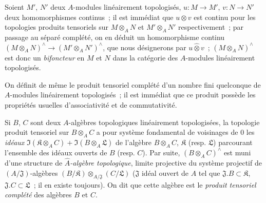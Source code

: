 \begin{env}[7.7.3]
\label{0.7.7.3-fr}
Soient $M'$, $N'$ deux $A$-modules linéairement topologisés,
$u:M\to M'$, $v:N\to N'$ deux homomorphismes continus~; il est immédiat
que $u\otimes v$ est continu pour les topologies produits tensoriels sur
$M\otimes_A N$ et $M'\otimes_A N'$ respectivement~; par passage au séparé
complété, on en déduit un homomorphisme continu
$(M\otimes_A N)^\wedge\to(M'\otimes_A N')^\wedge$, que nous désignerons
par $u\widehat\otimes v$~; $(M\otimes_A N)^\wedge$ est donc un
\emph{bifoncteur} en $M$ et $N$ dans la catégorie des $A$-modules
linéairement topologisés.
\end{env}

\begin{env}[7.7.4]
\label{0.7.7.4-fr}
On définit de même le produit tensoriel complété d'un nombre fini quelconque
de $A$-modules linéairement topologisés~; il est immédiat que ce produit
possède les propriétés usuelles d'associativité et de commutativité.
\end{env}

\begin{env}[7.7.5]
\label{0.7.7.5-fr}
Si $B$, $C$ sont deux $A$-algèbres topologiques linéairement topologisées,
la topologie produit tensoriel sur $B\otimes_A C$ a pour système fondamental
de voisinages de $0$ les \emph{idéaux}
$\Im(\mathfrak K\otimes_A C)+\Im(B\otimes_A\mathfrak L)$ de l'algèbre
$B\otimes_A C$, $\mathfrak K$ (resp. $\mathfrak L$) parcourant l'ensemble
des idéaux ouverts de $B$ (resp. $C$). Par suite, $(B\otimes_A C)^\wedge$
est muni d'une structure de \emph{$\widehat A$-algèbre topologique}, limite
projective du système projectif de $(A/\mathfrak J)$-algèbres
$(B/\mathfrak K)\otimes_{A/\mathfrak J}(C/\mathfrak L)$ ($\mathfrak J$
idéal ouvert de $A$ tel que $\mathfrak J.B\subset\mathfrak K$,
$\mathfrak J.C\subset\mathfrak L$~; il en existe toujours). On dit que
cette algèbre est le \emph{produit tensoriel complété} des algèbres $B$ et
$C$.
\end{env}

